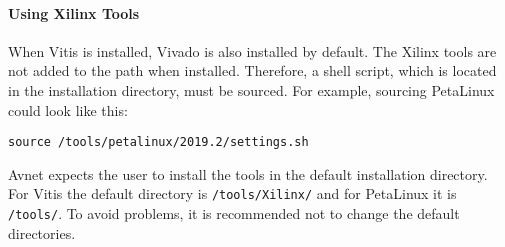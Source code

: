 \paragraph{Using Xilinx Tools}
When Vitis is installed, Vivado is also installed by default.
The Xilinx tools are not added to the path when installed.
Therefore, a shell script, which is located in the installation directory, must be sourced.
For example, sourcing PetaLinux could look like this:
\begin{lstlisting}[style=bash, caption={}, label=lst:source_tools]
  source /tools/petalinux/2019.2/settings.sh
\end{lstlisting}
Avnet expects the user to install the tools in the default installation directory.
For Vitis the default directory is \texttt{/tools/Xilinx/} and for PetaLinux it is \texttt{/tools/}.
To avoid problems, it is recommended not to change the default directories.
